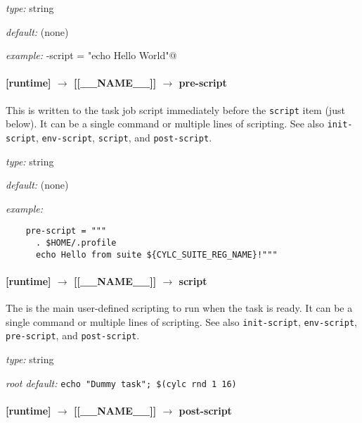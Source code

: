 \begin{myitemize}
\item {\em type:} string
\item {\em default:} (none)
\item {\em example:} \lstinline@env-script = "echo Hello World"@
\end{myitemize}

\paragraph[pre-script]{ [runtime] $\rightarrow$ [[\_\_NAME\_\_]] $\rightarrow$ pre-script}

This is written to the task job script immediately before the \lstinline=script=
item (just below). It can be a single command or multiple lines of scripting.
See also \lstinline=init-script=, \lstinline=env-script=, \lstinline=script=, and
\lstinline=post-script=.

\begin{myitemize}
\item {\em type:} string
\item {\em default:} (none)
\item {\em example:}
 \begin{lstlisting}
    pre-script = """
      . $HOME/.profile
      echo Hello from suite ${CYLC_SUITE_REG_NAME}!"""
 \end{lstlisting}
\end{myitemize}

\paragraph[script]{[runtime] $\rightarrow$ [[\_\_NAME\_\_]] $\rightarrow$ script}
\label{ScriptItem}

The is the main user-defined scripting to run when the task is ready. It can be a
single command or multiple lines of scripting. See also \lstinline=init-script=,
\lstinline=env-script=, \lstinline=pre-script=, and \lstinline=post-script=.

\begin{myitemize}
\item {\em type:} string
\item {\em root default:} \lstinline=echo "Dummy task"; $(cylc rnd 1 16)=
\end{myitemize}

\paragraph[post-script]{ [runtime] $\rightarrow$ [[\_\_NAME\_\_]] $\rightarrow$ post-script}


